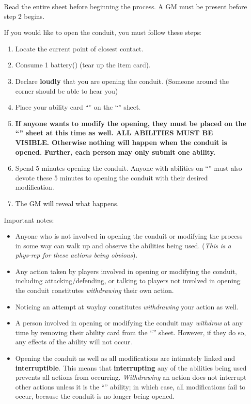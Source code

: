 \documentclass[green]{elementals}
\begin{document}
\name{\gConduit{}}

Read the entire sheet before beginning the process. A GM must be present before step 2 begins.


If you would like to open the conduit, you must follow these steps:
\begin{enumerate}
  \item Locate the current point of closest contact.
  \item Consume 1 battery(\iBattery{\MYnumber{}}) (tear up the item card).
  \item Declare {\bf loudly} that you are opening the conduit. (Someone around the corner should be able to hear you)
  \item Place your ability card ``\aWorkConduit{}'' on the ``\gConduitModifier{}'' sheet.
  \item {\bf If anyone wants to modify the opening, they must be placed on the ``\gConduitModifier{}'' sheet at this time as well. ALL ABILITIES MUST BE VISIBLE. Otherwise nothing will happen when the conduit is opened. Further, each person may only submit {\bf one} ability.}
  \item Spend 5 minutes opening the conduit. Anyone with abilities on ``\gConduitModifier{}'' must also devote these 5 minutes to opening the conduit with their desired modification.
  \item The GM will reveal what happens.
\end{enumerate}

Important notes:
\begin{itemize}
  \item Anyone who is not involved in opening the conduit or modifying the process in some way can walk up and observe the abilities being used. (\emph{This is a phys-rep for these actions being obvious}).
  \item Any action taken by players involved in opening or modifying the conduit, including attacking/defending, or talking to players not involved in opening the conduit constitutes \emph{withdrawing} their own action.
  \item Noticing an attempt at waylay constitutes \emph{withdrawing} your action as well.
  \item A person involved in opening or modifying the conduit may \emph{withdraw} at any time by removing their ability card from the ``\gConduitModifier{}'' sheet. However, if they do so, any effects of the ability will not occur.
  \item Opening the conduit as well as all modifications are intimately linked and {\bf interruptible}. This means that {\bf interrupting} any of the abilities being used prevents all actions from occurring. \emph{Withdrawing} an action does not interrupt other actions unless it is the ``\aWorkConduit{}'' ability; in which case, all modifications fail to occur, because the conduit is no longer being opened.
\end{itemize}
\end{document}
